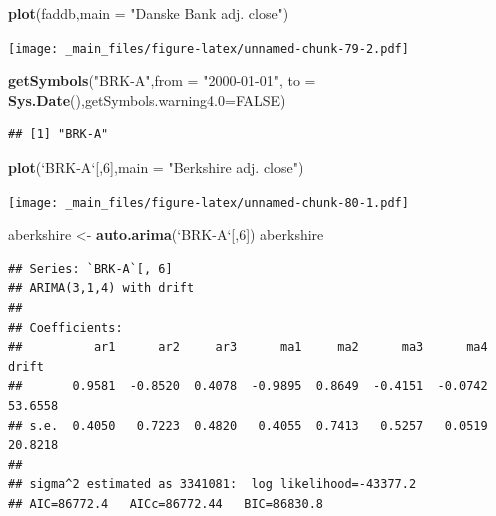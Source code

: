 \documentclass[]{book}
\newenvironment{Shaded}{\begin{snugshade}}{\end{snugshade}}
\newcommand{\DataTypeTok}[1]{\textcolor[rgb]{0.13,0.29,0.53}{#1}}
\newcommand{\DecValTok}[1]{\textcolor[rgb]{0.00,0.00,0.81}{#1}}
\newcommand{\KeywordTok}[1]{\textcolor[rgb]{0.13,0.29,0.53}{\textbf{#1}}}
\newcommand{\NormalTok}[1]{#1}
\newcommand{\OtherTok}[1]{\textcolor[rgb]{0.56,0.35,0.01}{#1}}
\newcommand{\StringTok}[1]{\textcolor[rgb]{0.31,0.60,0.02}{#1}}
\begin{document}
\begin{Shaded}
\begin{Highlighting}[]
\KeywordTok{plot}\NormalTok{(faddb,}\DataTypeTok{main =} \StringTok{"Danske Bank adj. close"}\NormalTok{)}
\end{Highlighting}
\end{Shaded}

\texttt{[image: \_main\_files/figure-latex/unnamed-chunk-79-2.pdf]}

\begin{Shaded}
\begin{Highlighting}[]
\KeywordTok{getSymbols}\NormalTok{(}\StringTok{"BRK-A"}\NormalTok{,}\DataTypeTok{from =} \StringTok{"2000-01-01"}\NormalTok{, }\DataTypeTok{to =} \KeywordTok{Sys.Date}\NormalTok{(),}\DataTypeTok{getSymbols.warning4.0=}\OtherTok{FALSE}\NormalTok{)}
\end{Highlighting}
\end{Shaded}

\begin{verbatim}
## [1] "BRK-A"
\end{verbatim}

\begin{Shaded}
\begin{Highlighting}[]
\KeywordTok{plot}\NormalTok{(}\StringTok{`}\DataTypeTok{BRK-A}\StringTok{`}\NormalTok{[,}\DecValTok{6}\NormalTok{],}\DataTypeTok{main =} \StringTok{"Berkshire adj. close"}\NormalTok{)}
\end{Highlighting}
\end{Shaded}

\texttt{[image: \_main\_files/figure-latex/unnamed-chunk-80-1.pdf]}

\begin{Shaded}
\begin{Highlighting}[]
\NormalTok{aberkshire <-}\StringTok{ }\KeywordTok{auto.arima}\NormalTok{(}\StringTok{`}\DataTypeTok{BRK-A}\StringTok{`}\NormalTok{[,}\DecValTok{6}\NormalTok{])}
\NormalTok{aberkshire}
\end{Highlighting}
\end{Shaded}

\begin{verbatim}
## Series: `BRK-A`[, 6] 
## ARIMA(3,1,4) with drift 
## 
## Coefficients:
##          ar1      ar2     ar3      ma1     ma2      ma3      ma4    drift
##       0.9581  -0.8520  0.4078  -0.9895  0.8649  -0.4151  -0.0742  53.6558
## s.e.  0.4050   0.7223  0.4820   0.4055  0.7413   0.5257   0.0519  20.8218
## 
## sigma^2 estimated as 3341081:  log likelihood=-43377.2
## AIC=86772.4   AICc=86772.44   BIC=86830.8
\end{verbatim}
\end{document}
